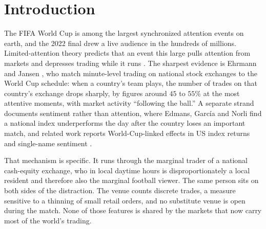 \documentclass[12pt]{article}
\begin{document}
\tableofcontents
\bigskip

\section{Introduction}\label{sec:intro}
The FIFA World Cup is among the largest synchronized attention events on earth, and the 2022 final drew a live audience in the hundreds of millions. Limited-attention theory predicts that an event this large pulls attention from markets and depresses trading while it runs \cite{barber2008,hirshleifer2009,dellavigna2009}. The sharpest evidence is Ehrmann and Jansen \cite{ehrmann2017}, who match minute-level trading on national stock exchanges to the World Cup schedule: when a country's team plays, the number of trades on that country's exchange drops sharply, by figures around $45$ to $55\%$ at the most attentive moments, with market activity ``following the ball.'' A separate strand documents sentiment rather than attention, where Edmans, Garc\'ia and Norli \cite{edmans2007} find a national index underperforms the day after the country loses an important match, and related work reports World-Cup-linked effects in US index returns and single-name sentiment \cite{kaplanski2010,bernile2011}.

That mechanism is specific. It runs through the marginal trader of a national cash-equity exchange, who in local daytime hours is disproportionately a local resident and therefore also the marginal football viewer. The same person sits on both sides of the distraction. The venue counts discrete trades, a measure sensitive to a thinning of small retail orders, and no substitute venue is open during the match. None of those features is shared by the markets that now carry most of the world's trading.
\end{document}

